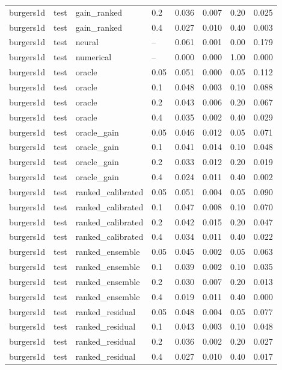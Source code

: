 \begin{longtable}{llllrrrr}
burgers1d & test & gain\_ranked & 0.2 & 0.036 & 0.007 & 0.20 & 0.025 \\
burgers1d & test & gain\_ranked & 0.4 & 0.027 & 0.010 & 0.40 & 0.003 \\
burgers1d & test & neural & -- & 0.061 & 0.001 & 0.00 & 0.179 \\
burgers1d & test & numerical & -- & 0.000 & 0.000 & 1.00 & 0.000 \\
burgers1d & test & oracle & 0.05 & 0.051 & 0.000 & 0.05 & 0.112 \\
burgers1d & test & oracle & 0.1 & 0.048 & 0.003 & 0.10 & 0.088 \\
burgers1d & test & oracle & 0.2 & 0.043 & 0.006 & 0.20 & 0.067 \\
burgers1d & test & oracle & 0.4 & 0.035 & 0.002 & 0.40 & 0.029 \\
burgers1d & test & oracle\_gain & 0.05 & 0.046 & 0.012 & 0.05 & 0.071 \\
burgers1d & test & oracle\_gain & 0.1 & 0.041 & 0.014 & 0.10 & 0.048 \\
burgers1d & test & oracle\_gain & 0.2 & 0.033 & 0.012 & 0.20 & 0.019 \\
burgers1d & test & oracle\_gain & 0.4 & 0.024 & 0.011 & 0.40 & 0.002 \\
burgers1d & test & ranked\_calibrated & 0.05 & 0.051 & 0.004 & 0.05 & 0.090 \\
burgers1d & test & ranked\_calibrated & 0.1 & 0.047 & 0.008 & 0.10 & 0.070 \\
burgers1d & test & ranked\_calibrated & 0.2 & 0.042 & 0.015 & 0.20 & 0.047 \\
burgers1d & test & ranked\_calibrated & 0.4 & 0.034 & 0.011 & 0.40 & 0.022 \\
burgers1d & test & ranked\_ensemble & 0.05 & 0.045 & 0.002 & 0.05 & 0.063 \\
burgers1d & test & ranked\_ensemble & 0.1 & 0.039 & 0.002 & 0.10 & 0.035 \\
burgers1d & test & ranked\_ensemble & 0.2 & 0.030 & 0.007 & 0.20 & 0.013 \\
burgers1d & test & ranked\_ensemble & 0.4 & 0.019 & 0.011 & 0.40 & 0.000 \\
burgers1d & test & ranked\_residual & 0.05 & 0.048 & 0.004 & 0.05 & 0.077 \\
burgers1d & test & ranked\_residual & 0.1 & 0.043 & 0.003 & 0.10 & 0.048 \\
burgers1d & test & ranked\_residual & 0.2 & 0.036 & 0.002 & 0.20 & 0.027 \\
burgers1d & test & ranked\_residual & 0.4 & 0.027 & 0.010 & 0.40 & 0.017 \\

\end{longtable}
